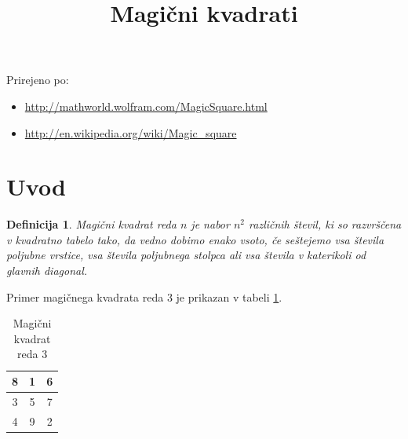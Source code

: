 \documentclass[a4paper,12pt]{article}
\title{Magični kvadrati}
\date{}
\newtheorem{definicija}{Definicija}
\begin{document}
\maketitle

Prirejeno po:

\begin{itemize}
   \item \url{http://mathworld.wolfram.com/MagicSquare.html}
   \item \url{http://en.wikipedia.org/wiki/Magic_square}
\end{itemize}

\tableofcontents

\newpage

\section{Uvod}

 \begin{definicija}
   \emph{Magični kvadrat} reda \(n\) je nabor \(n^2\) različnih števil,
   ki so razvrščena v kvadratno tabelo tako, da vedno dobimo enako vsoto,
   če seštejemo vsa števila poljubne vrstice, vsa števila poljubnega
   stolpca ali vsa števila v katerikoli od glavnih diagonal.
 \end{definicija}

Primer magičnega kvadrata reda 3 je prikazan v tabeli \ref{table:mag3}. %

   
  
  \begin{table}[h]
   \centering
   \caption{Magični kvadrat reda 3}
    \large\begin{tabular}{|c|c|c|}
      \hline
       8 & 1 & 6 \\\hline
       3 & 5 & 7 \\\hline
       4 & 9 & 2 \\\hline
    \end{tabular}\normalsize
    \label{table:mag3}
  \end{table}
\end{document}

